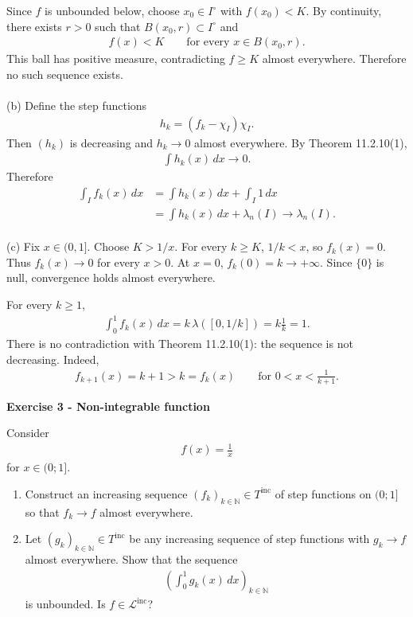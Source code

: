 \documentclass[12pt,a4paper]{article}
\begin{document}
Since $f$ is unbounded below, choose $x_0\in I^\circ$
with $f(x_0)<K$. By continuity, there exists $r>0$
such that $B(x_0,r)\subset I^\circ$ and
\begin{align*}
f(x)<K\qquad\text{for every }x\in B(x_0,r).
\end{align*}
This ball has positive measure, contradicting
$f\geq K$ almost everywhere. Therefore no such
sequence exists.\\
\\
(b) Define the step functions
\begin{align*}
h_k=(f_k-\chi_I)\chi_I.
\end{align*}
Then $(h_k)$ is decreasing and $h_k\to0$
almost everywhere. By Theorem 11.2.10(1),
\begin{align*}
\int h_k(x)\,dx\longrightarrow0.
\end{align*}
Therefore
\begin{align*}
\int_I f_k(x)\,dx
&=\int h_k(x)\,dx+\int_I 1\,dx\\
&=\int h_k(x)\,dx+\lambda_n(I)
\longrightarrow\lambda_n(I).
\end{align*}
\\
(c)
Fix $x\in(0,1]$. Choose $K>1/x$.
For every $k\geq K$, $1/k<x$, so $f_k(x)=0$.
Thus $f_k(x)\to0$ for every $x>0$.
At $x=0$, $f_k(0)=k\to+\infty$.
Since $\{0\}$ is null, convergence holds almost everywhere.

For every $k\geq1$,
\begin{align*}
\int_0^1 f_k(x)\,dx
=k\,\lambda([0,1/k])=k\frac1k=1.
\end{align*}
There is no contradiction with Theorem 11.2.10(1):
the sequence is not decreasing. Indeed,
\begin{align*}
f_{k+1}(x)=k+1>k=f_k(x)
\qquad\text{for }0<x<\frac1{k+1}.
\end{align*}

\newpage
\noindent
\textbf{Exercise 3 - Non-integrable function}

Consider
\begin{align*}
f(x)=\frac{1}{x}
\end{align*}
for $x\in(0;1]$.

\begin{enumerate}
\item[(a)] Construct an increasing sequence
$(f_k)_{k\in\mathbb{N}}\in T^{\mathrm{inc}}$
of step functions on $(0;1]$ so that $f_k\to f$
almost everywhere.

\item[(b)] Let $(g_k)_{k\in\mathbb{N}}\in T^{\mathrm{inc}}$
be any increasing sequence of step functions with
$g_k\to f$ almost everywhere. Show that the sequence
\begin{align*}
\left(\int_0^1 g_k(x)\,dx\right)_{k\in\mathbb{N}} \tag{3.1}
\end{align*}
is unbounded. Is $f\in\mathcal{L}^{\mathrm{inc}}$?
\end{enumerate}
\end{document}
